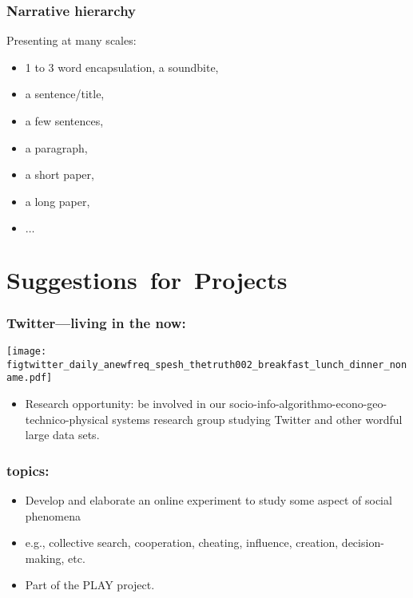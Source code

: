 \begin{frame}
  \frametitle{Narrative hierarchy}

  \begin{block}{Presenting at many scales:}
    \begin{itemize}
    \item 
      1 to 3 word encapsulation, a soundbite,
    \item 
      a sentence/title,
    \item 
      a few sentences,
    \item 
      a paragraph,
    \item 
      a short paper,
    \item 
      a long paper,
    \item 
      $\ldots$
    \end{itemize}
  \end{block}

\end{frame}

\section{Suggestions\ for\ Projects}



\begin{frame}
  \frametitle{Twitter---living in the now:}

  \begin{block}{}
    \texttt{[image: figtwitter\_daily\_anewfreq\_spesh\_thetruth002\_breakfast\_lunch\_dinner\_noname.pdf]}
    \begin{itemize}
    \item 
      Research opportunity: be involved in our socio-info-algorithmo-econo-geo-technico-physical systems research group
      studying Twitter and other wordful large data sets.
    \end{itemize}
  \end{block}

\end{frame}

  \begin{frame}
    \frametitle{topics:}

    \begin{block}{}
    \begin{itemize}
    \item<1->    
      Develop and elaborate an \alert{online experiment}
      to study some aspect of \alert{social phenomena}
    \item<2-> e.g., 
      collective search, 
      cooperation, 
      cheating, 
      influence, 
      creation,
      decision-making, 
      etc.
    \item<3-> Part of the PLAY project.
    \end{itemize}
    \end{block}

  \end{frame}


